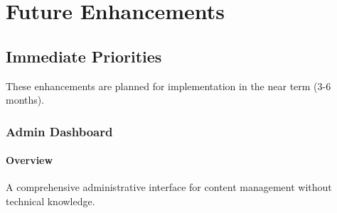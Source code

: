 \documentclass[12pt,a4paper]{report}
\begin{document}
\chapter{Future Enhancements}

\section{Immediate Priorities}

These enhancements are planned for implementation in the near term (3-6 months).

\subsection{Admin Dashboard}

\subsubsection*{Overview}
A comprehensive administrative interface for content management without technical knowledge.
\end{document}

